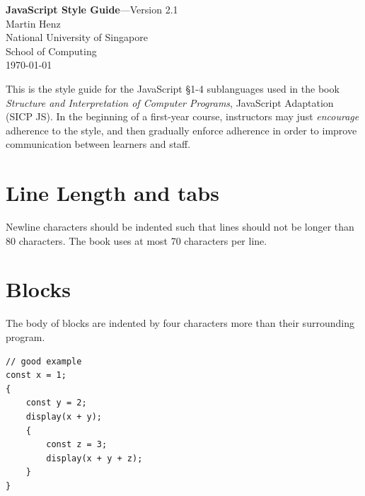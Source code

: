 

\usepackage{CJKutf8}

\parindent=20pt


  \thispagestyle{empty}
  
\begin{center}
  {\Large {\bf JavaScript Style Guide}---Version 2.1}\\[10mm]

  {\large Martin Henz}\\[5mm]

  {\large National University of Singapore \\
          School of Computing}\\[10mm]

  {\large \today}\\[10mm]
\end{center}
\noindent
This is the style guide for the JavaScript §1-4 sublanguages
used in the book \emph{Structure and Interpretation
of Computer Programs}, JavaScript Adaptation (SICP JS). 
In the beginning of a first-year course, instructors may just \emph{encourage}
adherence to the style, and then gradually enforce adherence in order to
improve communication between learners and staff.

\section*{Line Length and tabs}
  Newline characters should be indented such that lines
  should not be longer than 80 characters. The book uses at most
  70 characters per line.

\section*{Blocks}

The body of blocks are indented by four characters more than their surrounding program.
\begin{lstlisting}
// good example
const x = 1;
{
    const y = 2;
    display(x + y);
    {
        const z = 3;
        display(x + y + z);
    }
}
\end{lstlisting}

\vspace{-4mm}

